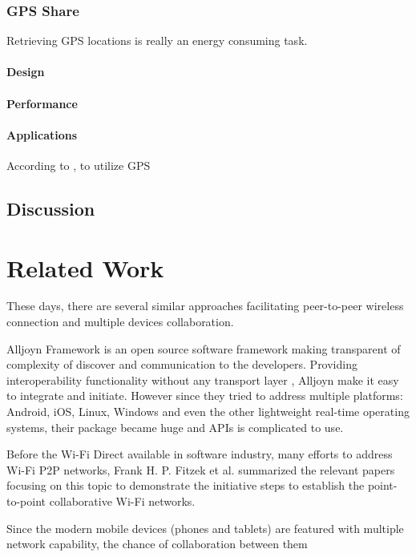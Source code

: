 \documentclass[conference]{IEEEtran}
\begin{document}
\subsubsection{GPS Share}
Retrieving GPS locations is really an energy consuming task. 

\paragraph{Design}
\paragraph{Performance}

\paragraph{Applications}
According to \cite{rio}, to utilize GPS

\subsection{Discussion}

\section{Related Work}
\label{sec:related}
These days, there are several similar approaches facilitating peer-to-peer wireless connection and multiple devices collaboration. 

Alljoyn Framework \cite{alljoyn} is an open source software framework making transparent of complexity of discover and communication to the developers. Providing interoperability functionality without any transport layer , Alljoyn make it easy to integrate and initiate. However since they tried to address multiple platforms: Android, iOS, Linux, Windows and even the other lightweight real-time operating systems, their package became huge and APIs is complicated to use. 

Before the Wi-Fi Direct available in software industry, many efforts to address Wi-Fi P2P networks, Frank H. P. Fitzek et al. \cite{m_p2p_tutor} summarized the relevant papers focusing on this topic to demonstrate the initiative steps to establish the point-to-point collaborative Wi-Fi networks. 

Since the modern mobile devices (phones and tablets) are featured with multiple network capability, the chance of collaboration between them 
\end{document}
